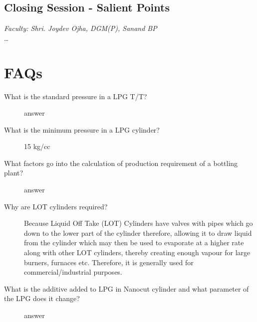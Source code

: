 \documentclass{report}
\begin{document}
	\subsection{Closing Session - Salient Points}
	\textit{Faculty: Shri. Joydev Ojha, DGM(P), Sanand BP}\\
	\ldots
	
	\section{FAQs}
	\begin{description}
		\item[What is the standard pressure in a LPG T/T?] answer
		\item[What is the minimum pressure in a LPG cylinder?] 15 kg/cc
		\item[What factors go into the calculation of production requirement of a bottling plant?] answer
		\item[Why are LOT cylinders required?] Because Liquid Off Take (LOT) Cylinders have valves with pipes which go down to the lower part of the cylinder therefore, allowing it to draw liquid from the cylinder which may then be used to evaporate at a higher rate along with other LOT cylinders, thereby creating enough vapour for large burners, furnaces etc. Therefore, it is generally used for commercial/industrial purposes.
		\item[What is the additive added to LPG in Nanocut cylinder and what parameter of the LPG does it change?] answer
	\end{description}
\end{document}
